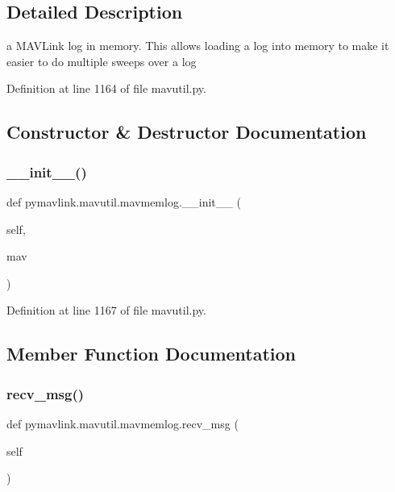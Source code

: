 \subsection{Detailed Description}
\begin{DoxyVerb}a MAVLink log in memory. This allows loading a log into
memory to make it easier to do multiple sweeps over a log\end{DoxyVerb}
 

Definition at line 1164 of file mavutil.\+py.



\subsection{Constructor \& Destructor Documentation}
\mbox{\label{classpymavlink_1_1mavutil_1_1mavmemlog_ad593163b44c0cb40074ed0b28553a5f9}} 
\subsubsection{\texorpdfstring{\_\_init\_\_()}{\_\_init\_\_()}}
{\footnotesize\ttfamily def pymavlink.\+mavutil.\+mavmemlog.\+\_\+\+\_\+init\+\_\+\+\_\+ (\begin{DoxyParamCaption}\item[{}]{self,  }\item[{}]{mav }\end{DoxyParamCaption})}



Definition at line 1167 of file mavutil.\+py.



\subsection{Member Function Documentation}
\mbox{\label{classpymavlink_1_1mavutil_1_1mavmemlog_a7a84e52fc8bf9a84624c848c4a2229da}} 
\subsubsection{\texorpdfstring{recv\_msg()}{recv\_msg()}}
{\footnotesize\ttfamily def pymavlink.\+mavutil.\+mavmemlog.\+recv\+\_\+msg (\begin{DoxyParamCaption}\item[{}]{self }\end{DoxyParamCaption})}

